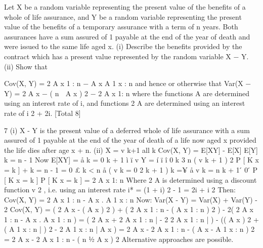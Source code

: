\documentclass[a4paper,12pt]{article}
\begin{document}
Let X be a random variable representing the present value of the benefits of a
whole of life assurance, and Y be a random variable representing the present
value of the benefits of a temporary assurance with a term of n years. Both
assurances have a sum assured of 1 payable at the end of the year of death and
were issued to the same life aged x.
(i) Describe the benefits provided by the contract which has a present
value represented by the random variable X − Y.
(ii) Show that

Cov(X, Y) = 2 A x 1 : n − A x A 1 x : n
and hence or otherwise that
Var(X − Y) = 2 A x − ( n  A x ) 2 − 2 A x 1: n
where the functions A are determined using an interest rate of i, and
functions 2 A are determined using an interest rate of i 2 + 2i.
[Total 8]


7
(i) X - Y is the present value of a deferred whole of life assurance with a sum
assured of 1 payable at the end of the year of death of a life now aged x
provided the life dies after age x + n.
(ii) X = v k+1
all k
Cov(X, Y)
= E[XY] - E[X] E[Y]
k = n - 1
Now E[XY] =
å
k = 0
k + 1
ì
ï v
Y = í
ï
î 0
k 3 n
( v k + 1 ) 2 P [ K x = k ] +
k = n - 1
=
0 £ k < n
å ( v
k = 0
2 k + 1
)
k =¥
å v
k = n
k + 1
 ́ 0  ́ P [ K x = k ]
P [ K x = k ]
= 2 A x 1: n
Where 2 A is determined using a discount function v 2 , i.e. using an interest
rate
i* = (1 + i) 2 - 1 = 2i + i 2
Then: Cov(X, Y) = 2 A x 1 : n - A x . A 1 x : n
Now: Var(X - Y) = Var(X) + Var(Y) - 2 Cov(X, Y)
= ( 2 A x - ( A x ) 2 ) + ( 2 A x 1 : n - ( A x 1 : n ) 2 ) - 2( 2 A x 1 : n - A x . A x 1 : n )
= ( 2 A x + 2 A x 1 : n | - 2 2 A x 1 : n | ) - (( A x ) 2 + ( A 1 x : n | ) 2 - 2 A 1 x : n | A x )
= 2 A x - 2 A x 1 : n - ( A x - A 1 x : n ) 2
= 2 A x - 2 A x 1 : n - ( n 1⁄2 A x ) 2
Alternative approaches are possible.
\end{document}
